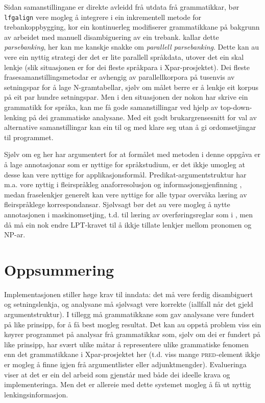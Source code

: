 \documentclass[12pt,a4paper,oneside,draft]{report}
\newcommand{\F}[2]{\textsc{#1}\ensuremath{_{#2}}}
\newcommand{\PRED}{\F{pred}{}}
\begin{document}
Sidan samanstillingane er direkte avleidd frå utdata frå grammatikkar,
 bør \texttt{lfgalign} vere mogleg å integrere i ein inkrementell metode for
 trebankoppbygging, kor ein kontinuerleg modifiserer grammatikkane på
 bakgrunn av arbeidet med manuell disambiguering av ein trebank.
 \citet{rosen2007tmt} kallar dette \emph{parsebanking}, her kan me kanskje
 snakke om \emph{parallell parsebanking}. Dette kan au vere ein nyttig
 strategi der det er lite parallell språkdata, utover det ein skal
 lenkje (slik situasjonen er for dei fleste språkpara i
 Xpar-prosjektet). Dei fleste frasesamanstillingsmetodar er avhengig
 av parallellkorpora på tusenvis av setningspar for å lage
 N-gramtabellar, sjølv om målet berre er å lenkje eit korpus på eit
 par hundre setningspar. Men i den situasjonen der nokon har skrive
 ein grammatikk for språka, kan me få gode samanstillingar ved hjelp
 av top-down-lenking på dei grammatiske analysane. Med eit godt
 brukargrensesnitt for val av alternative samanstillingar kan ein til
 og med klare seg utan å gi ordomsetjingar til programmet.

Sjølv om eg her har argumentert for at formålet med metoden i denne
 oppgåva er å lage annotasjonar som er nyttige for språkstudium, er
 det ikkje umogleg at desse kan vere nyttige for
 applikasjonsformål. Predikat-argumentstruktur har m.a. vore nyttig i
 fleirspråkleg anaforresolusjon og informasjonsgjenfinning
 \citep{surdeanu2003upa,azzam1998crm}, medan fraselenkjer generelt kan
 vere nyttige for alle typar overvåka læring av fleirspråklege
 korrespondansar. Sjølvsagt bør det au vere mogleg å nytte
 annotasjonen i maskinomsetjing, t.d. til læring av overføringsreglar
 som i \citet{riezler2006gmt,graham2009fts}, men då må ein nok endre
 LPT-kravet til å ikkje tillate lenkjer mellom pronomen og NP-ar.


\section{Oppsummering}
\label{sec-5.6}

Implementasjonen stiller høge krav til inndata: det må vere ferdig
 disambiguert og setningslenkja, og analysane må sjølvsagt vere
 korrekte (iallfall når det gjeld argumentstruktur). I tillegg må
 grammatikkane som gav analysane vere fundert på like prinsipp, for å
 få best mogleg resultat. Det kan au oppstå problem viss ein køyrer
 programmet på analysar frå grammatikkar som, sjølv om dei er fundert
 på like prinsipp, har svært ulike måtar å representere ulike
 grammatiske fenomen enn det grammatikkane i Xpar-prosjektet her
 (t.d. viss mange \PRED{}-element ikkje er mogleg å finne igjen frå
 argumentlister eller adjunktmengder). Evalueringa viser at det er ein
 del arbeid som gjenstår med både dei ideelle krava og
 implementeringa. Men det er allereie med dette systemet mogleg å få
 ut nyttig lenkingsinformasjon.
\end{document}
